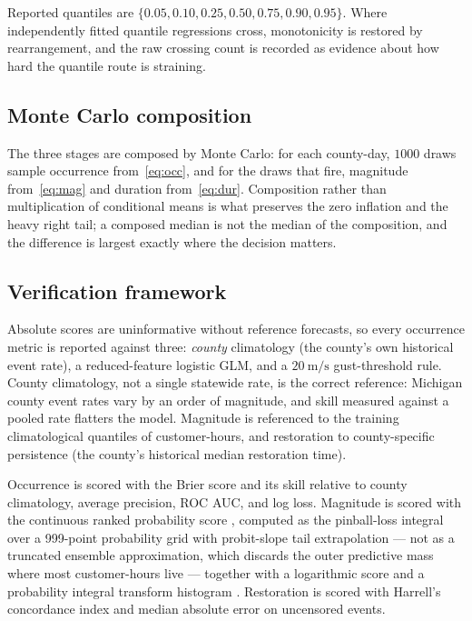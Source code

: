 \documentclass[10pt,twocolumn,letterpaper]{article}
\newcommand{\CH}{customer-hours}
\begin{document}
Reported quantiles are $\{0.05,0.10,0.25,0.50,0.75,0.90,0.95\}$. Where
independently fitted quantile regressions cross, monotonicity is restored by
rearrangement, and the raw crossing count is recorded as evidence about how hard
the quantile route is straining.

\subsection{Monte Carlo composition}

The three stages are composed by Monte Carlo: for each county-day, $1000$ draws
sample occurrence from~\eqref{eq:occ}, and for the draws that fire, magnitude
from~\eqref{eq:mag} and duration from~\eqref{eq:dur}. Composition rather than
multiplication of conditional means is what preserves the zero inflation and the
heavy right tail; a composed median is not the median of the composition, and
the difference is largest exactly where the decision matters.

\subsection{Verification framework}

Absolute scores are uninformative without reference forecasts, so every
occurrence metric is reported against three: \emph{county} climatology (the
county's own historical event rate), a reduced-feature logistic GLM, and a
$\SI{20}{\meter\per\second}$ gust-threshold rule. County climatology, not a
single statewide rate, is the correct reference: Michigan county event rates
vary by an order of magnitude, and skill measured against a pooled rate flatters
the model. Magnitude is referenced to the training climatological quantiles of
\CH{}, and restoration to county-specific persistence (the county's historical
median restoration time).

Occurrence is scored with the Brier score \citep{brier1950verification} and its
skill relative to county climatology, average precision, ROC AUC, and log loss.
Magnitude is scored with the continuous ranked probability score
\citep{gneiting2007scoringrules}, computed as the pinball-loss integral over a
999-point probability grid with probit-slope tail extrapolation --- not as a
truncated ensemble approximation, which discards the outer predictive mass where
most \CH{} live --- together with a logarithmic score and a probability integral
transform histogram \citep{gneiting2007calibration}. Restoration is scored with
Harrell's concordance index \citep{harrell1982yield} and median absolute error
on uncensored events.
\end{document}

